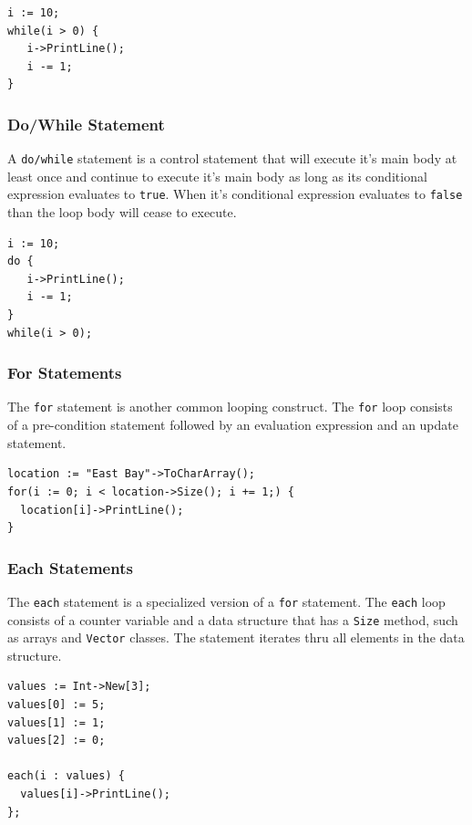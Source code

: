 \documentclass[11pt]{article}
\begin{document}
\begin{verbatim}
i := 10;
while(i > 0) {
   i->PrintLine();
   i -= 1;
}
\end{verbatim}

\subsubsection{Do/While Statement}

A \texttt{do/while} statement is a control statement that will execute
it's main body at least once and continue to execute it's main body as
long as its conditional expression evaluates to \texttt{true}.  When
it's conditional expression evaluates to \texttt{false} than the loop
body will cease to execute.

\begin{verbatim}
i := 10;
do { 
   i->PrintLine();
   i -= 1;
} 
while(i > 0);
\end{verbatim}

\subsubsection{For Statements}

The \texttt{for} statement is another common looping construct.  The
\texttt{for} loop consists of a pre-condition statement followed by an
evaluation expression and an update statement.

\begin{verbatim}
location := "East Bay"->ToCharArray();
for(i := 0; i < location->Size(); i += 1;) {
  location[i]->PrintLine();
}
\end{verbatim}

\subsubsection{Each Statements}

The \texttt{each} statement is a specialized version of a \texttt{for}
statement.  The \texttt{each} loop consists of a counter variable and
a data structure that has a \texttt{Size} method, such as arrays and
\texttt{Vector} classes.  The statement iterates thru all elements in
the data structure.

\begin{verbatim}
values := Int->New[3];
values[0] := 5;
values[1] := 1;
values[2] := 0;

each(i : values) {
  values[i]->PrintLine();
};
\end{verbatim}
\end{document}
